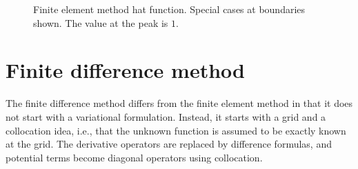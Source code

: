 \documentclass[12pt]{article}
\begin{document}
\begin{figure}[htbp]
    \centering
    \caption{Finite element method hat function. Special cases at boundaries shown. The value at the peak is $1$.}
    \label{fig:fem-basis}
\end{figure}






\section{Finite difference method}


The finite difference method differs from the finite element method in that it
does not start with a variational formulation. Instead, it starts with a grid and a collocation idea, i.e., that the unknown function is assumed to be exactly known at the grid. The derivative operators are replaced by difference formulas, and potential terms become diagonal operators using collocation.
\end{document}
